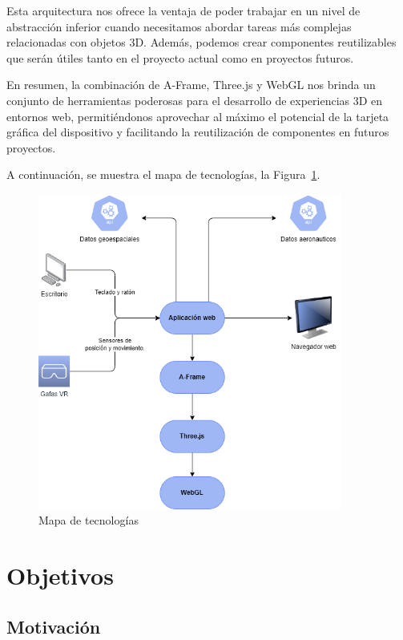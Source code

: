 \documentclass[a4paper, 11pt]{book}
\begin{document}
Esta arquitectura nos ofrece la ventaja de poder trabajar en un nivel de abstracción inferior cuando necesitamos abordar tareas más complejas relacionadas con objetos 3D. Además, podemos crear componentes reutilizables que serán útiles tanto en el proyecto actual como en proyectos futuros.

En resumen, la combinación de A-Frame, Three.js y WebGL nos brinda un conjunto de herramientas poderosas para el desarrollo de experiencias 3D en entornos web, permitiéndonos aprovechar al máximo el potencial de la tarjeta gráfica del dispositivo y facilitando la reutilización de componentes en futuros proyectos.

A continuación, se muestra el mapa de tecnologías, la Figura~\ref{figura:mapaTecnologias}. 


 \begin{figure}[h]
    \centering
    \includegraphics[bb=0 0 564 586, width=10cm, keepaspectratio]{img/mapaFuncional.drawio.png}
    \caption{Mapa de tecnologías}
    \label{figura:mapaTecnologias}
 \end{figure}

\clearpage
\chapter{Objetivos}
\label{chap:objetivos}

\section{Motivación}
\label{sec:motivación}
\end{document}
